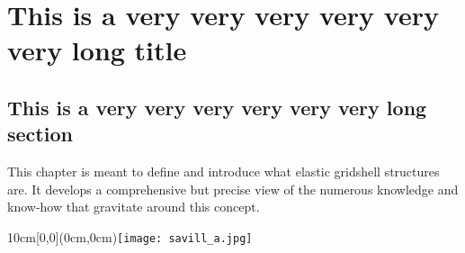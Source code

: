
\newrefsegment
\chapter{This is a very very very very very very long title}

\section{This is a very very very very very very long section}

This chapter is meant to define and introduce what elastic gridshell structures are. It develops a comprehensive but precise view of the numerous knowledge and know-how that gravitate around this concept.

\kant[1-26]


\cleartoleftpage
{}
\clearpage
{}


\clearpage
\kant[1-2]

\cleartoleftpage
\begin{textblock*}{10cm}[0,0](0cm,0cm)\noindent\texttt{[image: savill\_a.jpg]}\end{textblock*}




